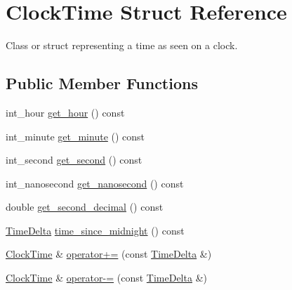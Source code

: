 \hypertarget{structClockTime}{\section{\-Clock\-Time \-Struct \-Reference}
\label{structClockTime}
}


\-Class or struct representing a time as seen on a clock.  


\subsection*{\-Public \-Member \-Functions}
\begin{DoxyCompactItemize}
\item 
int\-\_\-hour \hyperlink{structClockTime_ab188f450c2b8519296c96529afc8d92f}{get\-\_\-hour} () const 
\item 
int\-\_\-minute \hyperlink{structClockTime_ae882482085d1cc290b055381f407cb6a}{get\-\_\-minute} () const 
\item 
int\-\_\-second \hyperlink{structClockTime_a054e575b6ba259efdf3d79ebdf7fc501}{get\-\_\-second} () const 
\item 
int\-\_\-nanosecond \hyperlink{structClockTime_a4ddf3b506ad8f3576df034fbf3febae4}{get\-\_\-nanosecond} () const 
\item 
double \hyperlink{structClockTime_a174f09985d45efc748ca956c9ca2fb2e}{get\-\_\-second\-\_\-decimal} () const 
\item 
\hyperlink{structTimeDelta}{\-Time\-Delta} \hyperlink{structClockTime_a9c6423703cb0026435fb6e5b2d261d54}{time\-\_\-since\-\_\-midnight} () const 
\item 
\hyperlink{structClockTime}{\-Clock\-Time} \& \hyperlink{structClockTime_aec48dca559fd8b1f97c624eb45205d51}{operator+=} (const \hyperlink{structTimeDelta}{\-Time\-Delta} \&)
\item 
\hyperlink{structClockTime}{\-Clock\-Time} \& \hyperlink{structClockTime_ac5197cbbfba2f45bfeb9f24175c60b14}{operator-\/=} (const \hyperlink{structTimeDelta}{\-Time\-Delta} \&)
\end{DoxyCompactItemize}
